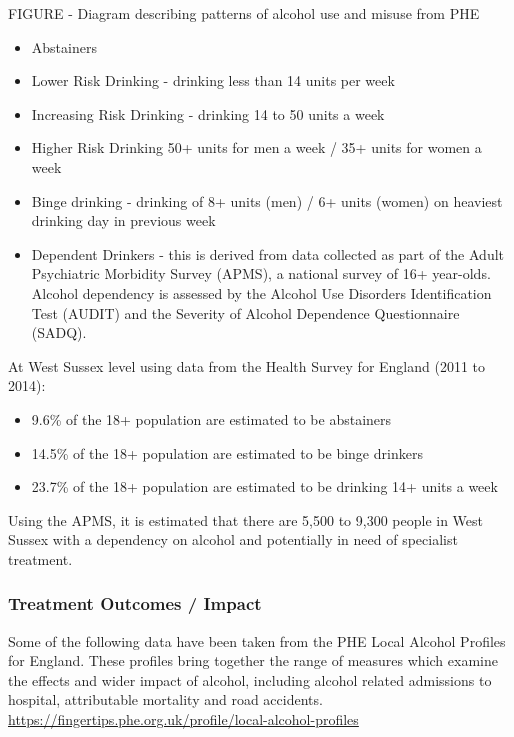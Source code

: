 FIGURE - Diagram describing patterns of alcohol use and misuse from PHE

\begin{itemize}[noitemsep]
    \item Abstainers
    \item Lower Risk Drinking - drinking less than 14 units per week
    \item Increasing Risk Drinking - drinking 14 to 50 units a week
    \item Higher Risk Drinking 50+ units for men a week / 35+ units for women a week
    \item Binge drinking - drinking of 8+ units (men) / 6+ units (women) on heaviest drinking day in previous week
    \item Dependent Drinkers - this is derived from data collected as part of the Adult Psychiatric Morbidity Survey (APMS), a national survey of 16+ year-olds. Alcohol dependency is assessed by the Alcohol Use Disorders Identification Test (AUDIT) and the Severity of Alcohol Dependence Questionnaire (SADQ).
\end{itemize}

At West Sussex level using data from the Health Survey for England (2011 to 2014): 

\begin{itemize}[noitemsep]
    \item 9.6\% of the 18+ population are estimated to be abstainers
    \item 14.5\% of the 18+ population are estimated to be binge drinkers
    \item 23.7\% of the 18+ population are estimated to be drinking 14+ units a week
\end{itemize}

Using the APMS, it is estimated that there are 5,500 to 9,300 people in West Sussex with a dependency on alcohol and potentially in need of specialist treatment.


\subsubsection{Treatment Outcomes / Impact}
Some of the following data have been taken from the PHE Local Alcohol Profiles for England. These profiles bring together the range of measures which examine the effects and wider impact of alcohol, including alcohol related admissions to hospital, attributable mortality and road accidents. \url{https://fingertips.phe.org.uk/profile/local-alcohol-profiles}

